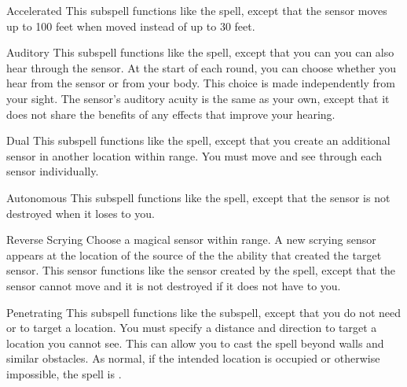 \begin{ability}[\nth{2}]{Accelerated}
This subspell functions like the  spell, except that the sensor moves up to 100 feet when moved instead of up to 30 feet.
\end{ability}
\vspace{0.25em}


\begin{ability}[\nth{2}]{Auditory}
This subspell functions like the  spell, except that you can you can also hear through the sensor.
At the start of each round, you can choose whether you hear from the sensor or from your body.
This choice is made independently from your sight.
The sensor's auditory acuity is the same as your own, except that it does not share the benefits of any  effects that improve your hearing.
\end{ability}
\vspace{0.25em}


\begin{ability}[\nth{2}]{Dual}
This subspell functions like the  spell, except that you create an additional sensor in another location within range.
You must move and see through each sensor individually.
\end{ability}
\vspace{0.25em}


\begin{ability}[\nth{3}]{Autonomous}
This subspell functions like the  spell, except that the sensor is not destroyed when it loses  to you.
\end{ability}
\vspace{0.25em}


\begin{ability}[\nth{4}]{Reverse Scrying}
Choose a magical sensor within \rngmed range.
A new scrying sensor appears at the location of the source of the the ability that created the target sensor.
This sensor functions like the sensor created by the  spell, except that the sensor cannot move and it is not destroyed if it does not have  to you.
\end{ability}
\vspace{0.25em}


\begin{ability}[\nth{5}]{Penetrating}
This subspell functions like the  subspell, except that you do not need  or  to target a location.
You must specify a distance and direction to target a location you cannot see.
This can allow you to cast the spell beyond walls and similar obstacles.
As normal, if the intended location is occupied or otherwise impossible, the spell is .
\end{ability}
\vspace{0.25em}


